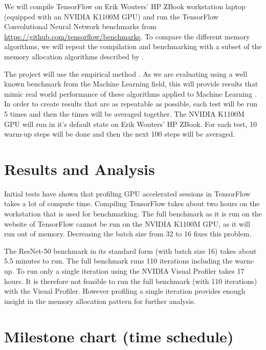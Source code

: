 \documentclass[12pt,twoside]{article}
\begin{document}

We will compile TensorFlow on Erik Wouters' HP ZBook workstation laptop (equipped with an NVIDIA K1100M GPU) and run the TensorFlow Convolutional Neural Network benchmarks from \url{https://github.com/tensorflow/benchmarks}. To compare the different memory algorithms, we will repeat the compilation and benchmarking with a subset of the memory allocation algorithms described by \citeauthor{Vinkler2015} \cite{Vinkler2015}.

The project will use the empirical method \cite{bock2001}. As we are evaluating using a well known benchmark from the Machine Learning field, this will provide results that mimic real world performance of these algorithms applied to Machine Learning \cite{abadi2016}. In order to create results that are as repeatable as possible, each test will be run 5 times and then the times will be averaged together. The NVIDIA K1100M GPU will run in it's default state on Erik Wouters' HP ZBook. For each test, 10 warm-up steps will be done and then the next 100 steps will be averaged.

\section{Results and Analysis}
\label{sec:results-and-analysis}
Initial tests have shown that profiling GPU accelerated sessions in TensorFlow takes a lot of compute time. Compiling TensorFlow takes about two hours on the workstation that is used for benchmarking. The full benchmark as it is run on the website of TensorFlow cannot be run on the NVIDIA K1100M GPU, as it will run out of memory. Decreasing the batch size from 32 to 16 fixes this problem.

The ResNet-50 benchmark in its standard form (with batch size 16) takes about 5.5 minutes to run. The full benchmark runs 110 iterations including the warm-up. To run only a single iteration using the NVIDIA Visual Profiler takes 17 hours. It is therefore not feasible to run the full benchmark (with 110 iterations) with the Visual Profiler. However profiling a single iteration provides enough insight in the memory allocation pattern for further analysis.

\section{Milestone chart (time schedule)}
\label{sec:milestone-chart}
\end{document}
